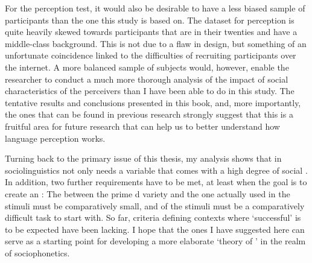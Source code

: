 For the perception test, it would also be desirable to have a less biased sample of participants than the one this study is based on.
The dataset for perception is quite heavily skewed towards participants that are in their twenties and have a middle-class background.
This is not due to a flaw in design, but something of an unfortunate coincidence linked to the difficulties of recruiting participants over the internet.
A more balanced sample of subjects would, however, enable the researcher to conduct a much more thorough analysis of the impact of social characteristics of the perceivers than I have been able to do in this study.
The tentative results and conclusions presented in this book, and, more importantly, the ones that can be found in previous research \parencite[cf.][]{hayetal2006a,haydrager2010} strongly suggest that this is a fruitful area for future research that can help us to better understand how language perception works.

Turning back to the primary issue of this thesis, my analysis shows that   in sociolinguistics not only needs a variable that comes with a high degree of social .
In addition, two further requirements have to be met, at least when the goal is to create an : 
The  between the prime d variety and the one actually used in the stimuli must be comparatively small, and  of the stimuli must be a comparatively difficult task to start with.
So far, criteria defining contexts where `successful'   is to be expected have been lacking.
I hope that the ones I have suggested here can serve as a starting point for developing a more elaborate `theory of ' \parencite[cf.][]{cesario2014} in the realm of sociophonetics.